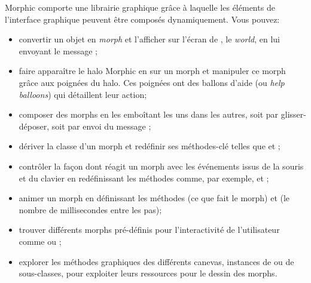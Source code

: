 \documentclass[a4paper,10pt,twoside]{book}
\begin{document}
Morphic comporte une librairie graphique grâce à laquelle les éléments de
l'interface graphique peuvent être composés dynamiquement.
Vous pouvez:
\begin{itemize}
  \item convertir un objet en \emph{morph} et l'afficher
    sur l'écran de \pharo, le \emph{world}, en lui envoyant le message
    ;
  \item faire apparaître le halo Morphic en \arelire{\metaclickant}
  sur un morph et manipuler ce morph
    grâce aux poignées du halo. Ces poignées ont des ballons
    d'aide (ou \emph{help balloons}) qui détaillent leur action;
  \item composer des morphs en les emboîtant les uns dans les autres,
    soit par glisser-déposer, soit par envoi du message ;
  \item dériver la classe d'un morph et redéfinir ses
    méthodes-clé telles que  et ;
  \item contrôler la façon dont réagit un morph avec les
    événements issus de la souris et du clavier en redéfinissant les
    méthodes comme, par exemple,  et
    ;
  \item animer un morph en définissant les méthodes 
    (ce que fait le morph) et  (le nombre de
    millisecondes entre les pas);
  \item trouver différents morphs pré-définis pour
    l'interactivité de l'utilisateur comme
     ou ;
  \item explorer les méthodes graphiques des différents canevas,
    instances de  ou de sous-classes,
    pour exploiter leurs ressources pour le dessin des morphs.
\end{itemize}

\ifx\wholebook\relax\else
\end{document}
